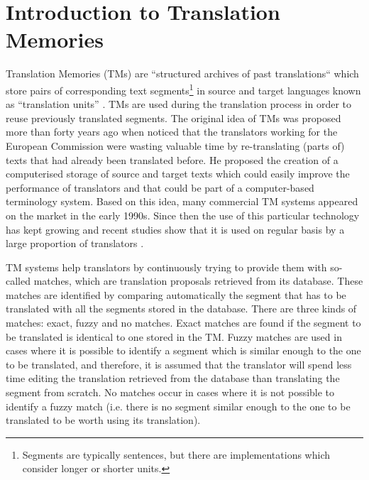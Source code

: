 \chapter{\label{cha:tm_introduction}Introduction to Translation Memories}

Translation Memories (TMs) are ``structured archives of past translations`` which store pairs of corresponding text segments\footnote{Segments are typically sentences, but there are implementations which consider longer or shorter units.} in source and target languages known as ``translation units'' \autocite{Simard2020}. TMs are used during the translation process in order to reuse previously translated segments. The original idea of TMs was proposed more than forty years ago when \autocite{Arthern1979} noticed that the translators working for the European Commission were wasting valuable time by re-translating (parts of) texts that had already been translated before. He proposed the creation of a computerised storage of source and target texts which could easily improve the performance of translators and that could be part of a computer-based terminology system. Based on this idea, many commercial TM systems appeared on the market in the early 1990s. Since then the use of this particular technology has kept growing and recent studies show that it is used on regular basis by a large proportion of translators  \autocite{zaretskaya:2018}.

TM systems help translators by continuously trying to provide them with so-called matches, which are translation proposals retrieved from its database. These matches are identified by comparing automatically the segment that has to be translated with all the segments stored in the database. There are three kinds of matches: exact, fuzzy and no matches. Exact matches are found if the segment to be translated is identical to one stored in the TM. Fuzzy matches are used in cases where it is possible to identify a segment which is similar enough to the one to be translated, and therefore, it is assumed that the translator will spend less time editing the translation retrieved from the database than translating the segment from scratch. No matches occur in cases where it is not possible to identify a fuzzy match (i.e. there is no segment similar enough to the one to be translated to be worth using its translation).

